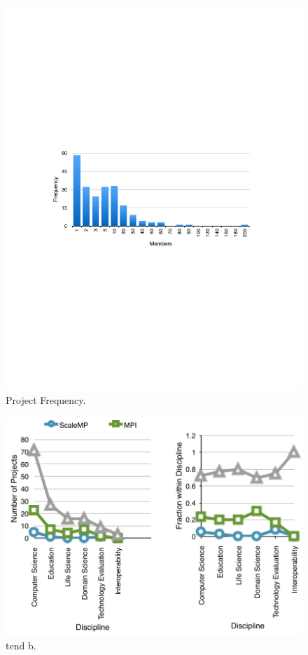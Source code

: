 \begin{figure}[htb]
  \centering
    \includegraphics[width=1.0\textwidth]{images/project-frequency.pdf}
  \caption{Project Frequency.}
\end{figure}

\begin{figure}[htb]
  \centering
    \includegraphics[width=1.0\textwidth]{images/trend-b.pdf}
  \caption{tend b.}
\end{figure}

